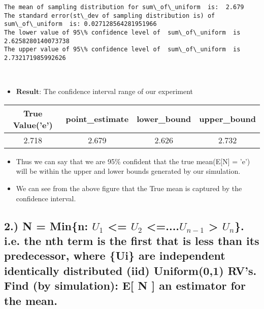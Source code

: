 \documentclass[11pt]{article}
\providecommand{\tightlist}{%
      \setlength{\itemsep}{0pt}\setlength{\parskip}{0pt}}
\begin{document}
    \begin{Verbatim}[commandchars=\\\{\}]
The mean of sampling distribution for sum\_of\_uniform  is:  2.679
The standard error(st\_dev of sampling distribution is) of  sum\_of\_uniform  is: 0.027128564281951966
The lower value of 95\% confidence level of  sum\_of\_uniform  is 2.6258280140073738
The upper value of 95\% confidence level of  sum\_of\_uniform  is 2.732171985992626

    \end{Verbatim}

    \begin{center}
    \end{center}
    { \hspace*{\fill} \\}
    
    \begin{itemize}
\tightlist
\item
  \(\textbf{Result}\): The confidence interval range of our experiment
\end{itemize}

\begin{longtable}[]{@{}cccc@{}}
\toprule
True Value('e') & point\_estimate & lower\_bound &
upper\_bound\tabularnewline
\midrule
\endhead
2.718 & 2.679 & 2.626 & 2.732\tabularnewline
\bottomrule
\end{longtable}

\begin{itemize}
\item
  Thus we can say that we are 95\% confident that the true mean(E{[}N{]}
  = 'e') will be within the upper and lower bounds generated by our
  simulation.
\item
  We can see from the above figure that the True mean is captured by the
  confidence interval.
\end{itemize}

    \subsection{\texorpdfstring{2.) N = Min\{n: \(U_1\) \textless{}= \(U_2\)
\textless{}=....\(U_{n-1}\) \textgreater{} \(U_n\)\}. i.e. the nth term
is the first that is less than its predecessor, where \{Ui\} are
independent identically distributed (iid) Uniform(0,1) RV's. Find (by
simulation): E{[} N {]} an estimator for the
mean.}{2.) N = Min\{n: U\_1 \textless{}= U\_2 \textless{}=....U\_\{n-1\} \textgreater{} U\_n\}. i.e. the nth term is the first that is less than its predecessor, where \{Ui\} are independent identically distributed (iid) Uniform(0,1) RV's. Find (by simulation): E{[} N {]} an estimator for the mean.}}\label{n-minn-u_1-u_2-....u_n-1-u_n.-i.e.-the-nth-term-is-the-first-that-is-less-than-its-predecessor-where-ui-are-independent-identically-distributed-iid-uniform01-rvs.-find-by-simulation-e-n-an-estimator-for-the-mean.}
\end{document}
